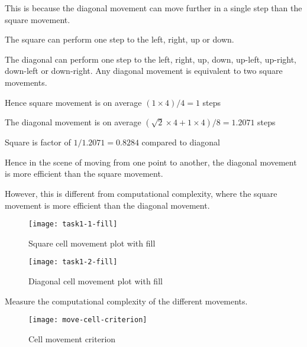This is because the diagonal movement can move further in a single step than the square movement.

The square can perform one step to the left, right, up or down.

The diagonal can perform one step to the left, right, up, down, up-left, up-right, down-left or down-right.
Any diagonal movement is equivalent to two square movements.

Hence square movement is on average $(1 \times 4) / 4 = 1$ steps

The diagonal movement is on average $(\sqrt{2} \times 4 + 1 \times 4) / 8 = 1.2071$ steps

Square is factor of $1 / 1.2071 = 0.8284$ compared to diagonal

Hence in the scene of moving from one point to another, the diagonal movement is more efficient than the square movement.

However, this is different from computational complexity, where the square movement is more efficient than the diagonal movement.



\clearpage

\begin{figure}[ht]
    \centering
    \texttt{[image: task1-1-fill]}
    \caption[Square cell movement plot with fill]{Square cell movement plot with fill}
    \label{fig:task1-1-fill}
\end{figure}

\begin{figure}[ht]
    \centering
    \texttt{[image: task1-2-fill]}
    \caption[Diagonal cell movement plot with fill]{Diagonal cell movement plot with fill}
    \label{fig:task1-2-fill}
\end{figure}

\clearpage

Measure the computational complexity of the different movements.

\begin{figure}[ht]
    \centering
    \texttt{[image: move-cell-criterion]}
    \caption[Cell movement criterion]{Cell movement criterion}
    \label{fig:move-cell-criterion}
\end{figure}

